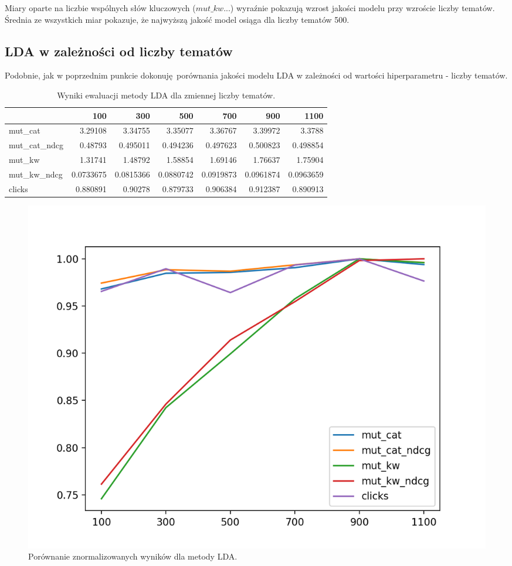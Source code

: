 \documentclass[pl]{minipw} %
\begin{document}
Miary oparte na liczbie wspólnych słów kluczowych ($mut\_kw...$) wyraźnie pokazują wzrost jakości modelu przy wzroście liczby tematów. Średnia ze wszystkich miar pokazuje, że najwyższą jakość model osiąga dla liczby tematów 500.

\subsection{LDA w zależności od liczby tematów}

Podobnie, jak w poprzednim punkcie dokonuję porównania jakości modelu LDA w zależności od wartości hiperparametru - liczby tematów.


\begin{table}
	\centering
	\begin{tabular}{lrrrrrr}
		\hline
		&       100 &       300 &       500 &       700 &       900 &      1100 \\
		\hline
		mut\_cat      & 3.29108   & 3.34755   & 3.35077   & 3.36767   & 3.39972   & 3.3788    \\
		mut\_cat\_ndcg & 0.48793   & 0.495011  & 0.494236  & 0.497623  & 0.500823  & 0.498854  \\
		mut\_kw       & 1.31741   & 1.48792   & 1.58854   & 1.69146   & 1.76637   & 1.75904   \\
		mut\_kw\_ndcg  & 0.0733675 & 0.0815366 & 0.0880742 & 0.0919873 & 0.0961874 & 0.0963659 \\
		clicks       & 0.880891  & 0.90278   & 0.879733  & 0.906384  & 0.912387  & 0.890913  \\
		\hline
	\end{tabular}
	\caption{Wyniki ewaluacji metody LDA dla zmiennej liczby tematów.}
\end{table}

\begin{figure}[H]
	\centering
	\includegraphics[width=1\textwidth]{img/results/lda.png}
	\caption{Porównanie znormalizowanych wyników dla metody LDA.}
\end{figure}
\end{document}
